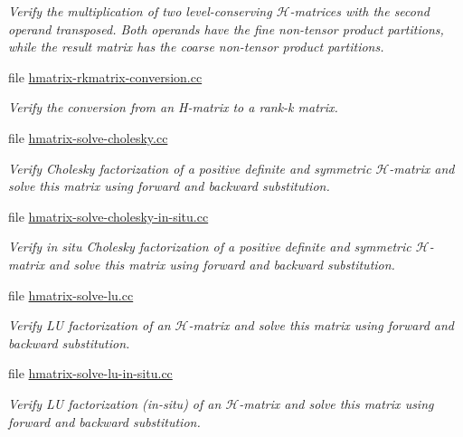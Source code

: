 \begin{DoxyCompactItemize}
\begin{DoxyCompactList}\small\item\em Verify the multiplication of two level-\/conserving $\mathcal{H}$-\/matrices with the second operand transposed. Both operands have the fine non-\/tensor product partitions, while the result matrix has the coarse non-\/tensor product partitions. \end{DoxyCompactList}\item 
file \hyperlink{hmatrix-rkmatrix-conversion_8cc}{hmatrix-\/rkmatrix-\/conversion.\+cc}
\begin{DoxyCompactList}\small\item\em Verify the conversion from an H-\/matrix to a rank-\/k matrix. \end{DoxyCompactList}\item 
file \hyperlink{hmatrix-solve-cholesky_8cc}{hmatrix-\/solve-\/cholesky.\+cc}
\begin{DoxyCompactList}\small\item\em Verify Cholesky factorization of a positive definite and symmetric $\mathcal{H}$-\/matrix and solve this matrix using forward and backward substitution. \end{DoxyCompactList}\item 
file \hyperlink{hmatrix-solve-cholesky-in-situ_8cc}{hmatrix-\/solve-\/cholesky-\/in-\/situ.\+cc}
\begin{DoxyCompactList}\small\item\em Verify in situ Cholesky factorization of a positive definite and symmetric $\mathcal{H}$-\/matrix and solve this matrix using forward and backward substitution. \end{DoxyCompactList}\item 
file \hyperlink{hmatrix-solve-lu_8cc}{hmatrix-\/solve-\/lu.\+cc}
\begin{DoxyCompactList}\small\item\em Verify LU factorization of an $\mathcal{H}$-\/matrix and solve this matrix using forward and backward substitution. \end{DoxyCompactList}\item 
file \hyperlink{hmatrix-solve-lu-in-situ_8cc}{hmatrix-\/solve-\/lu-\/in-\/situ.\+cc}
\begin{DoxyCompactList}\small\item\em Verify LU factorization (in-\/situ) of an $\mathcal{H}$-\/matrix and solve this matrix using forward and backward substitution. \end{DoxyCompactList}\item 

\end{DoxyCompactItemize}
